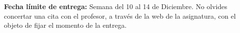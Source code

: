 \documentclass[11pt,heading,asymmetric,practice]{uniexer}
\begin{document}


 







\vspace*{2em}


\noindent \textbf{Fecha l\'imite de entrega:} Semana del 10
al 14 de Diciembre. 
No olvides concertar una cita con el profesor, a través de  la web de la 
asignatura, con el objeto de fijar el momento de la entrega.
\end{document}
